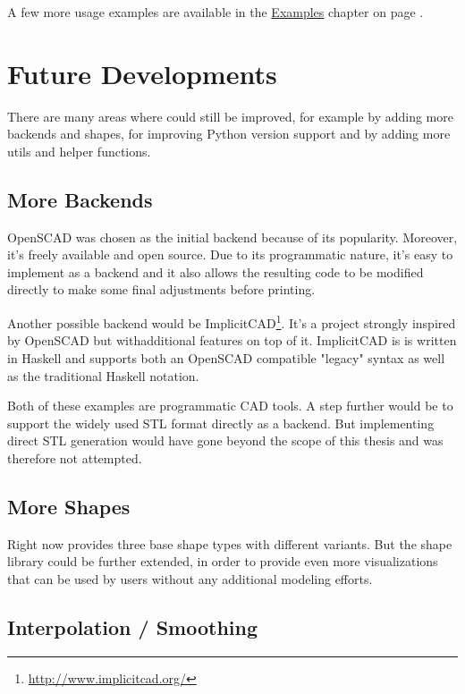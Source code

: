 \noindent A few more usage examples are available in the
\hyperref[ch:examples]{Examples} chapter on page \pageref{ch:examples}.


\section{Future Developments}\label{sec:features:future}

There are many areas where \tangible{} could still be improved, for example by
adding more backends and shapes, for improving Python version support and by
adding more utils and helper functions.

\subsection{More Backends}

OpenSCAD was chosen as the initial backend because of its popularity. Moreover,
it's freely available and open source. Due to its programmatic nature, it's easy
to implement as a backend and it also allows the resulting code to be modified
directly to make some final adjustments before printing.

Another possible backend would be
ImplicitCAD\footnote{\url{http://www.implicitcad.org/}}. It's a project strongly
inspired by OpenSCAD but withadditional features on top of it. ImplicitCAD is is
written in Haskell and supports both an OpenSCAD compatible "legacy" syntax as
well as the traditional Haskell notation.

Both of these examples are programmatic CAD tools. A step further would be to
support the widely used STL format directly as a backend. But implementing
direct STL generation would have gone beyond the scope of this thesis and was
therefore not attempted.

\subsection{More Shapes}

Right now \tangible{} provides three base shape types with different variants.
But the shape library could be further extended, in order to provide even more
visualizations that can be used by users without any additional modeling
efforts.

\subsection{Interpolation / Smoothing}

